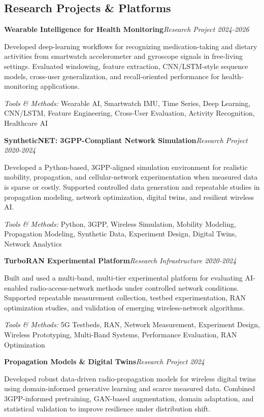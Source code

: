 \documentclass[10pt,letterpaper]{extarticle}
\newcommand{\entry}[2]{\Needspace{4\baselineskip}\textbf{#1}\hfill\textit{#2}\par}
\begin{document}
\subsection{Research Projects \& Platforms}
\entry{Wearable Intelligence for Health Monitoring}{Research Project \textbar{} 2024-2026}
Developed deep-learning workflows for recognizing medication-taking and dietary activities from smartwatch accelerometer and gyroscope signals in free-living settings. Evaluated windowing, feature extraction, CNN/LSTM-style sequence models, cross-user generalization, and recall-oriented performance for health-monitoring applications.\par
{\small\textit{Tools \& Methods:} Wearable AI, Smartwatch IMU, Time Series, Deep Learning, CNN/LSTM, Feature Engineering, Cross-User Evaluation, Activity Recognition, Healthcare AI\par}
\vspace{1pt}
\entry{SyntheticNET: 3GPP-Compliant Network Simulation}{Research Project \textbar{} 2020-2024}
Developed a Python-based, 3GPP-aligned simulation environment for realistic mobility, propagation, and cellular-network experimentation when measured data is sparse or costly. Supported controlled data generation and repeatable studies in propagation modeling, network optimization, digital twins, and resilient wireless AI.\par
{\small\textit{Tools \& Methods:} Python, 3GPP, Wireless Simulation, Mobility Modeling, Propagation Modeling, Synthetic Data, Experiment Design, Digital Twins, Network Analytics\par}
\vspace{1pt}
\entry{TurboRAN Experimental Platform}{Research Infrastructure \textbar{} 2020-2024}
Built and used a multi-band, multi-tier experimental platform for evaluating AI-enabled radio-access-network methods under controlled network conditions. Supported repeatable measurement collection, testbed experimentation, RAN optimization studies, and validation of emerging wireless-network algorithms.\par
{\small\textit{Tools \& Methods:} 5G Testbeds, RAN, Network Measurement, Experiment Design, Wireless Prototyping, Multi-Band Systems, Performance Evaluation, RAN Optimization\par}
\vspace{1pt}
\entry{Propagation Models \& Digital Twins}{Research Project \textbar{} 2024}
Developed robust data-driven radio-propagation models for wireless digital twins using domain-informed generative learning and scarce measured data. Combined 3GPP-informed pretraining, GAN-based augmentation, domain adaptation, and statistical validation to improve resilience under distribution shift.\par
\end{document}
